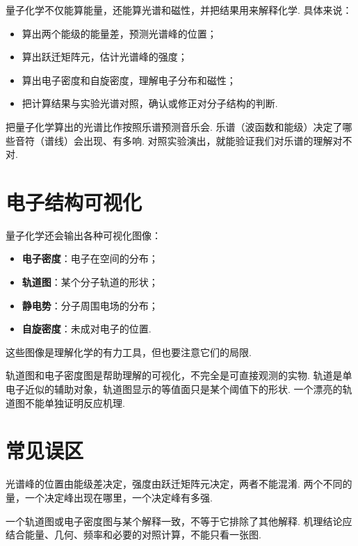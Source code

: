 \documentclass[UTF8,11pt,a4paper,openany]{ctexbook}
\begin{document}
量子化学不仅能算能量，还能算光谱和磁性，并把结果用来解释化学. 具体来说：

\begin{itemize}
\item 算出两个能级的能量差，预测光谱峰的位置；
\item 算出跃迁矩阵元，估计光谱峰的强度；
\item 算出电子密度和自旋密度，理解电子分布和磁性；
\item 把计算结果与实验光谱对照，确认或修正对分子结构的判断. 
\end{itemize}

\begin{analogybox}
把量子化学算出的光谱比作按照乐谱预测音乐会. 乐谱（波函数和能级）决定了哪些音符（谱线）会出现、有多响. 对照实验演出，就能验证我们对乐谱的理解对不对. 
\end{analogybox}

\section{电子结构可视化}

量子化学还会输出各种可视化图像：
\begin{itemize}
\item \textbf{电子密度}：电子在空间的分布；
\item \textbf{轨道图}：某个分子轨道的形状；
\item \textbf{静电势}：分子周围电场的分布；
\item \textbf{自旋密度}：未成对电子的位置. 
\end{itemize}

这些图像是理解化学的有力工具，但也要注意它们的局限. 

\begin{limitbox}
轨道图和电子密度图是帮助理解的可视化，不完全是可直接观测的实物. 轨道是单电子近似的辅助对象，轨道图显示的等值面只是某个阈值下的形状. 一个漂亮的轨道图不能单独证明反应机理. 
\end{limitbox}

\section{常见误区}

\begin{limitbox}
光谱峰的位置由能级差决定，强度由跃迁矩阵元决定，两者不能混淆. 两个不同的量，一个决定峰出现在哪里，一个决定峰有多强. 
\end{limitbox}

\begin{limitbox}
一个轨道图或电子密度图与某个解释一致，不等于它排除了其他解释. 机理结论应结合能量、几何、频率和必要的对照计算，不能只看一张图. 
\end{limitbox}
\end{document}

